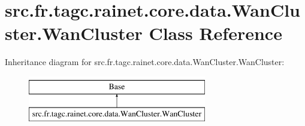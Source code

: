 \hypertarget{classsrc_1_1fr_1_1tagc_1_1rainet_1_1core_1_1data_1_1WanCluster_1_1WanCluster}{\section{src.\-fr.\-tagc.\-rainet.\-core.\-data.\-Wan\-Cluster.\-Wan\-Cluster Class Reference}
\label{classsrc_1_1fr_1_1tagc_1_1rainet_1_1core_1_1data_1_1WanCluster_1_1WanCluster}
}
Inheritance diagram for src.\-fr.\-tagc.\-rainet.\-core.\-data.\-Wan\-Cluster.\-Wan\-Cluster\-:\begin{figure}[H]
\begin{center}
\leavevmode
\includegraphics[height=2.000000cm]{classsrc_1_1fr_1_1tagc_1_1rainet_1_1core_1_1data_1_1WanCluster_1_1WanCluster}
\end{center}
\end{figure}
